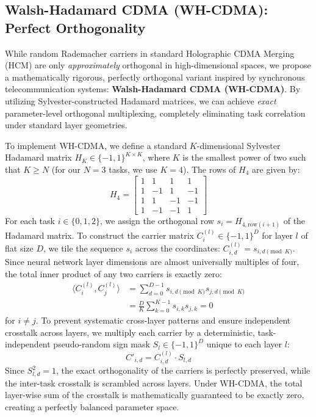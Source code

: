 \documentclass{article}
\begin{document}
\subsection{Walsh-Hadamard CDMA (WH-CDMA): Perfect Orthogonality}
\label{sec:wh_cdma}
While random Rademacher carriers in standard Holographic CDMA Merging (HCM) are only \textit{approximately} orthogonal in high-dimensional spaces, we propose a mathematically rigorous, perfectly orthogonal variant inspired by synchronous telecommunication systems: \textbf{Walsh-Hadamard CDMA (WH-CDMA)}. By utilizing Sylvester-constructed Hadamard matrices, we can achieve \textit{exact} parameter-level orthogonal multiplexing, completely eliminating task correlation under standard layer geometries.

To implement WH-CDMA, we define a standard $K$-dimensional Sylvester Hadamard matrix $H_K \in \{-1, 1\}^{K \times K}$, where $K$ is the smallest power of two such that $K \ge N$ (for our $N=3$ tasks, we use $K=4$). The rows of $H_4$ are given by:
\begin{equation}
    H_4 = \begin{bmatrix}
        1 & 1 & 1 & 1 \\
        1 & -1 & 1 & -1 \\
        1 & 1 & -1 & -1 \\
        1 & -1 & -1 & 1
    \end{bmatrix}
\end{equation}
For each task $i \in \{0, 1, 2\}$, we assign the orthogonal row $s_i = H_{4, \text{row}(i+1)}$ of the Hadamard matrix. To construct the carrier matrix $C_i^{(l)} \in \{-1, 1\}^D$ for layer $l$ of flat size $D$, we tile the sequence $s_i$ across the coordinates: $C_{i, d}^{(l)} = s_{i, d \pmod K}$. Since neural network layer dimensions are almost universally multiples of four, the total inner product of any two carriers is exactly zero:
\begin{equation}
\begin{split}
    \langle C_i^{(l)}, C_j^{(l)} \rangle &= \sum_{d=0}^{D-1} s_{i, d \pmod K} s_{j, d \pmod K} \\
    &= \frac{D}{K} \sum_{k=0}^{K-1} s_{i, k} s_{j, k} = 0
\end{split}
\end{equation}
for $i \neq j$. To prevent systematic cross-layer patterns and ensure independent crosstalk across layers, we multiply each carrier by a deterministic, task-independent pseudo-random sign mask $S_l \in \{-1, 1\}^D$ unique to each layer $l$:
\begin{equation}
    C'_{i, d} = C_{i, d}^{(l)} \cdot S_{l, d}
\end{equation}
Since $S_{l, d}^2 = 1$, the exact orthogonality of the carriers is perfectly preserved, while the inter-task crosstalk is scrambled across layers. Under WH-CDMA, the total layer-wise sum of the crosstalk is mathematically guaranteed to be exactly zero, creating a perfectly balanced parameter space.
\end{document}
